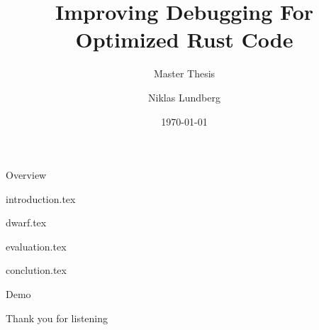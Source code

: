\documentclass[aspectratio=169,xcolor=dvipsnames]{beamer}
\title[short title]{Improving Debugging For Optimized Rust Code}
\subtitle{Master Thesis}
\author[Niklas] {Niklas Lundberg}
\institute[LTU] %
{
    Department of Computer Science, Electrical and Space Engineering \\
    Luleå University of Technology
    \vskip 3pt
}
\date{\today} %
\begin{document}
\begin{frame}
    \titlepage
\end{frame}

\begin{frame}{Overview}
    \tableofcontents
\end{frame}



{introduction.tex}


{dwarf.tex}




{evaluation.tex}


{conclution.tex}


\begin{frame}
    \Huge{\centerline{Demo}}
\end{frame}


\begin{frame}
    \Huge{\centerline{Thank you for listening}}
\end{frame}

\end{document}
